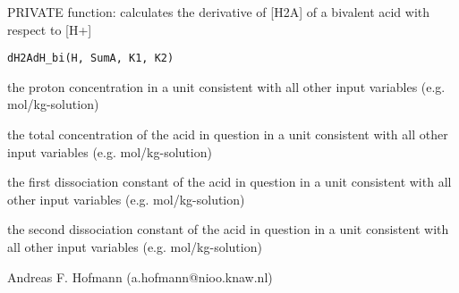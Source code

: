 \documentclass{article}
\begin{document}
\begin{Description}\relax
PRIVATE function: calculates the derivative of [H2A] of a bivalent acid with respect to [H+]
\end{Description}
\begin{Usage}
\begin{verbatim}dH2AdH_bi(H, SumA, K1, K2)\end{verbatim}
\end{Usage}
\begin{Arguments}
\begin{ldescription}
\item[\code{H }] the proton concentration in a unit consistent with all other input variables (e.g. mol/kg-solution)
\item[\code{SumA }] the total concentration of the acid in question in a unit consistent with all other input variables (e.g. mol/kg-solution)
\item[\code{K1 }] the first dissociation constant of the acid in question in a unit consistent with all other input variables (e.g. mol/kg-solution)
\item[\code{K2 }] the second dissociation constant of the acid in question in a unit consistent with all other input variables (e.g. mol/kg-solution)
\end{ldescription}
\end{Arguments}
\begin{Author}\relax
Andreas F. Hofmann (a.hofmann@nioo.knaw.nl)
\end{Author}
\end{document}
